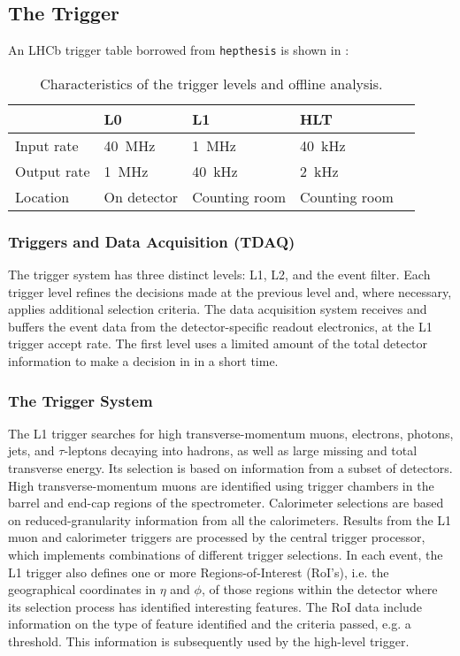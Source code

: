 \subsection{The Trigger}
\label{sec:bg-theory:triggers}
An LHCb trigger table borrowed from \texttt{hepthesis} is shown in :

\begin{table}[bht]
  \footnotesize\centering
  \setlength{\tabcolsep}{0.5em} %
  \caption{Characteristics of the trigger levels and offline analysis.}
  \begin{tabular}{lllll}
                & L0              & L1              & HLT             \\
    \midrule
    Input rate  & \SI{40}{\MHz} & \SI{1}{\MHz}  & \SI{40}{\kHz} \\
    Output rate & \SI{1}{\MHz}  & \SI{40}{\kHz} & \SI{2}{\kHz}  \\
    Location    & On detector     & Counting room   & Counting room   \\
  \end{tabular}
  \label{tab:bg-theory:trigger_details}
\end{table}


\subsubsection{Triggers and Data Acquisition (TDAQ)}

The trigger system has three distinct levels: L1, L2, and the event filter. Each trigger level refines the decisions made at the previous level and, where necessary, applies additional selection criteria. The data acquisition system receives and buffers the event data from the detector-specific readout electronics, at the L1 trigger accept rate. The first level uses a limited amount of the total detector information to make a decision in in a short time.


\subsubsection{The Trigger System}

The L1 trigger searches for high transverse-momentum muons, electrons, photons, jets, and $\tau$-leptons decaying into hadrons, as well as large missing and total transverse energy. Its selection is based on information from a subset of detectors. High transverse-momentum muons are identified using trigger chambers in the barrel and end-cap regions of the spectrometer. Calorimeter selections are based on reduced-granularity information from all the calorimeters. Results from the L1 muon and calorimeter triggers are processed by the central trigger processor, which implements combinations of different trigger selections. In each event, the L1 trigger also defines one or more Regions-of-Interest (RoI’s), i.e. the geographical coordinates in $\eta$ and $\phi$, of those regions within the detector where its selection process has identified interesting features. The RoI data include information on the type of feature identified and the criteria passed, e.g. a threshold. This information is subsequently used by the high-level trigger.

